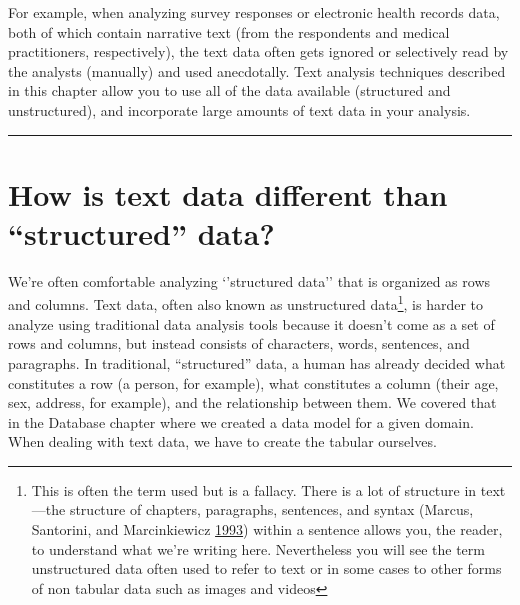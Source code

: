 \documentclass[]{krantz}
\begin{document}
For example, when analyzing survey responses or electronic health
records data, both of which contain narrative text (from the respondents
and medical practitioners, respectively), the text data often gets
ignored or selectively read by the analysts (manually) and used
anecdotally. Text analysis techniques described in this chapter allow
you to use all of the data available (structured and unstructured), and
incorporate large amounts of text data in your analysis.

\begin{center}\rule{0.5\linewidth}{\linethickness}\end{center}

\section{\texorpdfstring{How is text data different than ``structured''
data?}{How is text data different than structured data?}}\label{how-is-text-data-different-than-structured-data}

We're often comfortable analyzing `'structured data'' that is organized
as rows and columns. Text data, often also known as unstructured
data\footnote{This is often the term used but is a fallacy. There is a
  lot of structure in text---the structure of chapters, paragraphs,
  sentences, and syntax (Marcus, Santorini, and Marcinkiewicz
  \protect\hyperlink{ref-marcus-93}{1993}) within a sentence allows you,
  the reader, to understand what we're writing here. Nevertheless you
  will see the term unstructured data often used to refer to text or in
  some cases to other forms of non tabular data such as images and
  videos}, is harder to analyze using traditional data analysis tools
because it doesn't come as a set of rows and columns, but instead
consists of characters, words, sentences, and paragraphs. In
traditional, ``structured'' data, a human has already decided what
constitutes a row (a person, for example), what constitutes a column
(their age, sex, address, for example), and the relationship between
them. We covered that in the Database chapter where we created a data
model for a given domain. When dealing with text data, we have to create
the tabular ourselves.
\end{document}
